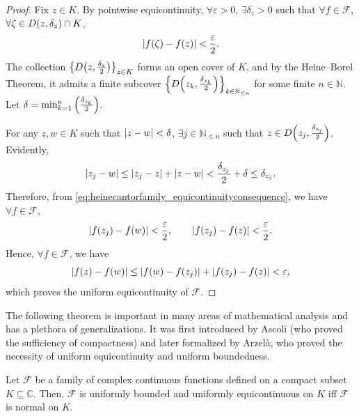 \begin{proof}
    Fix \(z\in K\). By pointwise equicontinuity, \(\forall\varepsilon>0\), \(\exists\delta_z>0\) such that \(\forall f\in\mathcal{F}\), \(\forall \zeta\in D\qty(z,\delta_z)\cap K\),
    \begin{equation}
        \abs{f(\zeta)-f(z)}<\frac{\varepsilon}{2}.\label{eq:heinecantorfamily_equicontinuityconsequence}
    \end{equation}
    The collection \(\textstyle\cbraces{D\qty(z,\frac{\delta_z}{2})}_{z\in K}\) forms an open cover of \(K\), and by the Heine--Borel Theorem, it admits a finite subcover \(\textstyle\cbraces{D\qty(z_k,\frac{\delta_{z_k}}{2})}_{k\in\mathbb{N}_{\leq n}}\) for some finite \(n\in\mathbb{N}\). Let \(\delta=\min_{k=1}^n\qty(\frac{\delta_{z_k}}{2})\).

    For any \(z,w\in K\) such that \(\abs{z-w}<\delta\), \(\exists j\in\mathbb{N}_{\leq n}\) such that \(z\in D\qty(z_j,\frac{\delta_{z_j}}{2})\). Evidently, \[\abs{z_j-w}\leq\abs{z_j-z}+\abs{z-w}<\frac{\delta_{z_j}}{2}+\delta\leq\delta_{z_j}.\]
    Therefore, from \cref{eq:heinecantorfamily_equicontinuityconsequence}, we have \(\forall f\in\mathcal{F}\), \[\abs{f\qty(z_j)-f\qty(w)}<\frac{\varepsilon}{2},\qquad\abs{f\qty(z_j)-f(z)}<\frac{\varepsilon}{2}.\]
    Hence, \(\forall f\in\mathcal{F}\), we have \[\abs{f\qty(z)-f(w)}\leq\abs{f(w)-f\qty(z_j)}+\abs{f\qty(z_j)-f(z)}<\varepsilon,\] which proves the uniform equicontinuity of \(\mathcal{F}\).
\end{proof}
The following theorem is important in many areas of mathematical analysis and has a plethora of generalizations. It was first introduced by Ascoli (who proved the sufficiency of compactness) and later formalized by Arzelà, who proved the necessity of uniform equicontinuity and uniform boundedness.
\begin{theorem}\label{thm:arzelaascoli}
    Let \(\mathcal{F}\) be a family of complex continuous functions defined on a compact subset \(K\subseteq\mathbb{C}\). Then, \(\mathcal{F}\) is uniformly bounded and uniformly equicontinuous on \(K\) iff \(\mathcal{F}\) is normal on \(K\).
\end{theorem}
